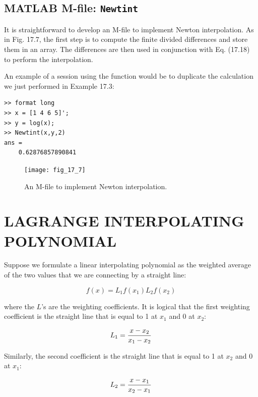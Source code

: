 \documentclass[../main.tex]{subfiles}
\begin{document}

\label{cha:cha_P_17_2_4} %
\subsection{MATLAB M-file: \texttt{Newtint}}

\noindent It is straightforward to develop an M-file to implement Newton interpolation. As in Fig. 17.7,
the first step is to compute the finite divided differences and store them in an array. The differences are then used in conjunction with Eq. (17.18) to perform the interpolation.

An example of a session using the function would be to duplicate the calculation we
just performed in Example 17.3:

\begin{lstlisting}[numbers=none]
>> format long
>> x = [1 4 6 5]';
>> y = log(x);
>> Newtint(x,y,2)
ans =
	0.62876857890841
\end{lstlisting}

\begin{figure}[H] 
	\centering
	\texttt{[image: fig\_17\_7]}
	\caption{\textsf{An M-file to implement Newton interpolation.}}
	\label{fig:fig_17_7}
\end{figure}

\label{cha:cha_P_17_3}
\section{LAGRANGE INTERPOLATING POLYNOMIAL}

\noindent Suppose we formulate a linear interpolating polynomial as the weighted average of the two
values that we are connecting by a straight line:

\begin{equation}
	\tag{17.19}
	f(x) = L_1 f(x_1) L_2 f(x_2)
\end{equation}

\noindent where the $L$'s are the weighting coefficients. It is logical that the first weighting coefficient
is the straight line that is equal to 1 at $x_1$ and 0 at $x_2$:

\begin{equation}
	\notag
	L_1 = \frac{x - x_2}{x_1 - x_2}
\end{equation}

\noindent Similarly, the second coefficient is the straight line that is equal to 1 at $x_2$ and 0 at $x_1$:

\begin{equation}
	\notag
	L_2 = \frac{x - x_1}{x_2 - x_1}
\end{equation}
\end{document}
